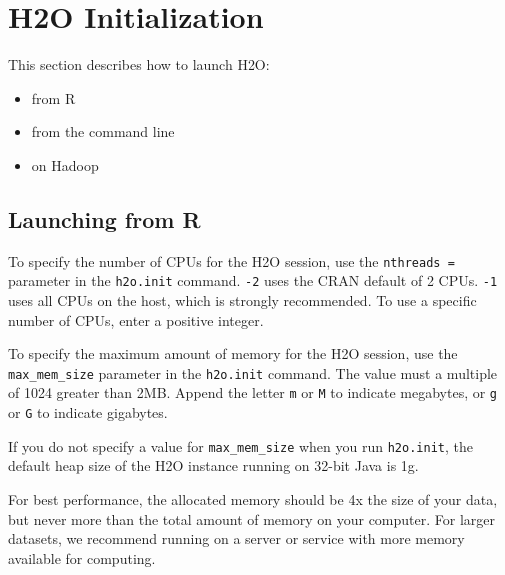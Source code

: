 {{%

\section{H2O Initialization}

This section describes how to launch H2O:
\begin{itemize}
\item from R
\item from the command line
\item on Hadoop
\end{itemize}

\subsection{Launching from R} \label{ssec:LaunchR}

To specify the number of CPUs for the H2O session, use the \texttt{nthreads = } parameter in the \texttt{h2o.init} command. \texttt{-2} uses the CRAN default of 2 CPUs. \texttt{-1} uses
all CPUs on the host, which is strongly recommended. To use a specific number of CPUs, enter a positive integer.

To specify the maximum amount of memory for the H2O session, use the {\texttt{max\_mem\_size}} parameter in the \texttt{h2o.init} command. The value must a multiple of 1024 greater than 2MB. Append the letter \texttt{m} or \texttt{M} to indicate megabytes, or \texttt{g} or \texttt{G} to indicate gigabytes.

If you do not specify a value for {\texttt{max\_mem\_size}} when you run {\texttt{h2o.init}}, the default heap size of the H2O instance running on 32-bit Java is 1g.

For best performance, the allocated memory should be 4x the size of your data, but never more than the total amount of memory on your computer. For larger datasets, we recommend running on a server or service with more memory available for computing.

}}
